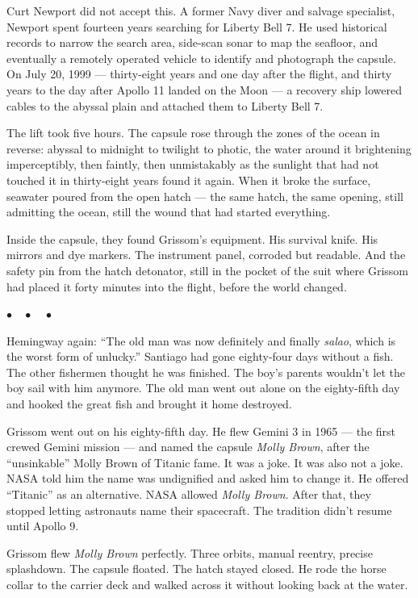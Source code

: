 \documentclass[12pt, letterpaper]{article}
\begin{document}
Curt Newport did not accept this. A former Navy diver and salvage specialist, Newport spent fourteen years searching for Liberty Bell 7. He used historical records to narrow the search area, side-scan sonar to map the seafloor, and eventually a remotely operated vehicle to identify and photograph the capsule. On July 20, 1999 --- thirty-eight years and one day after the flight, and thirty years to the day after Apollo 11 landed on the Moon --- a recovery ship lowered cables to the abyssal plain and attached them to Liberty Bell 7.

The lift took five hours. The capsule rose through the zones of the ocean in reverse: abyssal to midnight to twilight to photic, the water around it brightening imperceptibly, then faintly, then unmistakably as the sunlight that had not touched it in thirty-eight years found it again. When it broke the surface, seawater poured from the open hatch --- the same hatch, the same opening, still admitting the ocean, still the wound that had started everything.

Inside the capsule, they found Grissom's equipment. His survival knife. His mirrors and dye markers. The instrument panel, corroded but readable. And the safety pin from the hatch detonator, still in the pocket of the suit where Grissom had placed it forty minutes into the flight, before the world changed.

\begin{center}
$\bullet\quad\bullet\quad\bullet$
\end{center}

Hemingway again: ``The old man was now definitely and finally \emph{salao}, which is the worst form of unlucky.'' Santiago had gone eighty-four days without a fish. The other fishermen thought he was finished. The boy's parents wouldn't let the boy sail with him anymore. The old man went out alone on the eighty-fifth day and hooked the great fish and brought it home destroyed.

Grissom went out on his eighty-fifth day. He flew Gemini 3 in 1965 --- the first crewed Gemini mission --- and named the capsule \emph{Molly Brown}, after the ``unsinkable'' Molly Brown of Titanic fame. It was a joke. It was also not a joke. NASA told him the name was undignified and asked him to change it. He offered ``Titanic'' as an alternative. NASA allowed \emph{Molly Brown}. After that, they stopped letting astronauts name their spacecraft. The tradition didn't resume until Apollo 9.

Grissom flew \emph{Molly Brown} perfectly. Three orbits, manual reentry, precise splashdown. The capsule floated. The hatch stayed closed. He rode the horse collar to the carrier deck and walked across it without looking back at the water.
\end{document}

